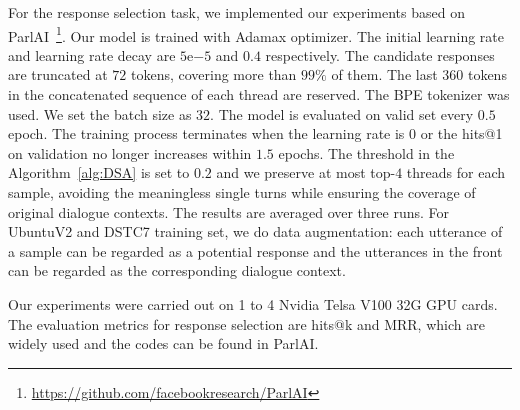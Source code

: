 For the response selection task, we implemented our experiments based on ParlAI~\footnote{\url{https://github.com/facebookresearch/ParlAI}}. Our model is trained with Adamax optimizer. The initial learning rate and learning rate decay are $5\mathrm{e}{-5}$ and $0.4$ respectively. The candidate responses are truncated at $72$ tokens, covering more than $99\%$ of them. The last $360$ tokens in the concatenated sequence of each thread are reserved. The BPE tokenizer was used. 
We set the batch size as $32$. The model is evaluated on valid set every $0.5$ epoch. 
The training process terminates when the learning rate is $0$ or the hits@1 on validation no longer increases within $1.5$ epochs. 
The threshold in the Algorithm~\ref{alg:DSA} is set to $0.2$ and we preserve at most top-$4$ threads for each sample, avoiding the meaningless single turns while ensuring the coverage of original dialogue contexts. The results are averaged over three runs.
For UbuntuV2 and DSTC7 training set, we do data augmentation: each utterance of a sample can be regarded as a potential response and the utterances in the front can be regarded as the corresponding dialogue context.

Our experiments were carried out on 1 to 4 Nvidia Telsa V100 32G GPU cards. The evaluation metrics for response selection are hits@k and MRR, which are widely used and the codes can be found in ParlAI. 
